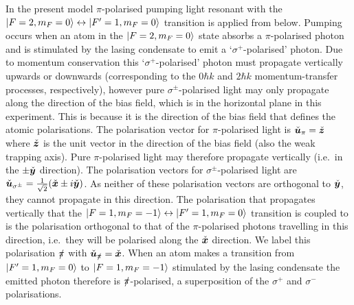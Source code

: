 In the present model $\pi$-polarised pumping light resonant with the ${\left|F=2, m_F=0\right>} \leftrightarrow {\ensuremath{\left|F'=1, m_F=0\right>}}$ transition is applied from below.  Pumping occurs when an atom in the ${\left|F=2, m_F=0\right>}$ state absorbs a $\pi$-polarised photon and is stimulated by the lasing condensate to emit a `$\sigma^+$-polarised' photon.  Due to momentum conservation this `$\sigma^+$-polarised' photon must propagate vertically upwards or downwards (corresponding to the $0\hbar k$ and $2 \hbar k$ momentum-transfer processes, respectively), however pure $\sigma^\pm$-polarised light may only propagate along the direction of the bias field, which is in the horizontal plane in this experiment.  This is because it is the direction of the bias field that defines the atomic polarisations.  The polarisation vector for $\pi$-polarised light is $\check{\bm{u}}_\pi = \check{\bm{z}}$ where $\check{\bm{z}}$ is the unit vector in the direction of the bias field (also the weak trapping axis).  Pure $\pi$-polarised light may therefore propagate vertically (i.e.\ in the $\pm \check{\bm{y}}$ direction).  The polarisation vectors for $\sigma^\pm$-polarised light are $\check{\bm{u}}_{\sigma^\pm} = \frac{1}{\sqrt{2}} (\check{\bm{x}} \pm i \check{\bm{y}})$.  As neither of these polarisation vectors are orthogonal to $\check{\bm{y}}$, they cannot propagate in this direction.  The polarisation that propagates vertically that the ${\left|F=1, m_F=-1\right>} \leftrightarrow {\ensuremath{\left|F'=1, m_F=0\right>}}$ transition is coupled to is the polarisation orthogonal to that of the $\pi$-polarised photons travelling in this direction, i.e.\ they will be polarised along the $\check{\bm{x}}$ direction.  We label this polarisation $\slashed{\pi}$ with $\check{\bm{u}}_{\slashed{\pi}} = \check{\bm{x}}$.  When an atom makes a transition from ${\left|F'=1, m_F=0\right>}$ to ${\left|F=1, m_F=-1\right>}$ stimulated by the lasing condensate the emitted photon therefore is $\slashed{\pi}$-polarised, a superposition of the $\sigma^+$ and $\sigma^-$ polarisations.

